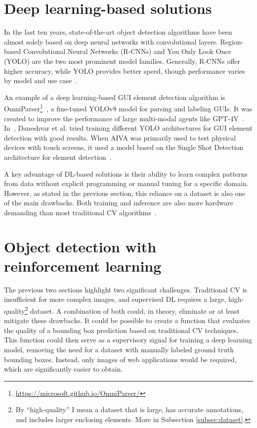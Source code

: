 \documentclass[
  digital,     %
  oneside,     %
  nosansbold,  %
  nocolorbold, %
  lof,         %
  lot,         %
]{fithesis4}
\begin{document}
\section{Deep learning-based solutions}
In the last ten years, state-of-the-art object detection algorithms have been almost solely based on deep neural networks with convolutional layers. Region-based Convolutional Neural Networks (R-CNNs) and You Only Look Once (YOLO) are the two most prominent model families. Generally, R-CNNs offer higher accuracy, while YOLO provides better speed, though performance varies by model and use case~\cite{ObjectDetectionHistorySurvey}.

An example of a deep learning-based GUI element detection algorithm is OmniParser\footnote{\url{https://microsoft.github.io/OmniParser/}}~, a fine-tuned YOLOv8 model for parsing and labeling GUIs. It was created to improve the performance of large multi-modal agents like GPT-4V~\cite{OmniParser}. In~\cite{GUI_YOLO_comparison}, Daneshvar et al. tried training different YOLO architectures for GUI element detection with good results. When AIVA was primarily used to test physical devices with touch screens, it used a model based on the Single Shot Detection architecture for element detection~\cite{Horak2020thesis}.

A key advantage of DL-based solutions is their ability to learn complex patterns from data without explicit programming or manual tuning for a specific domain. However, as stated in the previous section, this reliance on a dataset is also one of the main drawbacks. Both training and inference are also more hardware demanding than most traditional CV algorithms~\cite{DLvsTCV}.

\section{Object detection with reinforcement learning}

The previous two sections highlight two significant challenges. Traditional CV is insufficient for more complex images, and supervised DL requires a large, high-quality\footnote{By \enquote{high-quality} I mean a dataset that is large, has accurate annotations, and includes larger enclosing elements. More in Subsection \ref{subsec:dataset}.} dataset. A combination of both could, in theory, eliminate or at least mitigate these drawbacks. It could be possible to create a function that evaluates the quality of a bounding box prediction based on traditional CV techniques. This function could then serve as a supervisory signal for training a deep learning model, removing the need for a dataset with manually labeled ground truth bounding boxes. Instead, only images of web applications would be required, which are significantly easier to obtain.
\end{document}
